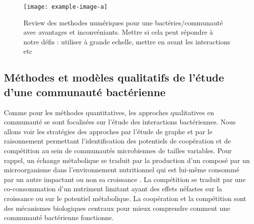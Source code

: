 \documentclass[../main.tex]{subfiles}
\begin{document}
\begin{figure}
    \centering
    \texttt{[image: example-image-a]}
    \caption{Review des methodes numériques pour une bactéries/communauté avec avantages et inconvéniants. Mettre si cela peut répondre à notre défis : utiliser à grande echelle, mettre en avant les interactions etc}
    \label{fig:my_label}
\end{figure}

\subsection{Méthodes et modèles qualitatifs de l'étude d'une communauté bactérienne}
Comme pour les méthodes quantitatives, les approches qualitatives en communauté se sont focalisées sur l'étude des interactions bactériennes. Nous allons voir les stratégies des approches par l'étude de graphe et par le raisonnement permettant l'identification des potentiels de coopération et de compétition au sein de communautés microbiennes de tailles variables. Pour rappel, un échange métabolique se traduit par la production d'un composé par un microorganisme dans l'environnement nutritionnel qui est lui-même consommé par un autre impactant ou non sa croissance \citep{Faust2012}. La compétition se traduit par une co-consommation d'un nutriment limitant ayant des effets néfastes sur la croissance ou sur le potentiel métabolique. La coopération et la compétition sont des mécanismes biologiques centraux pour mieux comprendre comment une communauté bactérienne fonctionne. \\
\end{document}
